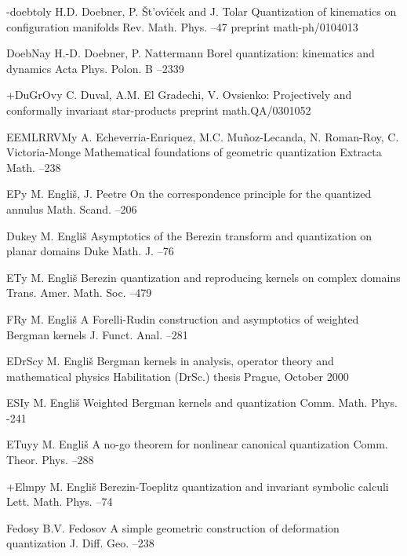 \documentclass[12pt]{amsart}
\numberwithin{equation}{section}
\theoremstyle{remark}
\newcommand{\by}{\mathbf y}
\begin{document}
\begin{thebibliography}{199}
 -doebtol\by{ H.D. Doebner, P. \v{S}t\!'ov{\'\i}\v{c}ek and J. Tolar
\paper Quantization of kinematics on configuration manifolds \jour Rev. Math.
Phys.   --47 \paperinfo preprint math-ph/0104013}

 DoebNa\by{ H.-D. Doebner, P. Nattermann \paper Borel quantization:
kinematics and dynamics \jour Acta Phys. Polon. B   --2339}

 +DuGrOv\by{ C. Duval, A.M. El Gradechi, V. Ovsienko: Projectively and
conformally invariant star-products \paperinfo preprint math.QA/0301052}

 EEMLRRVM\by{ A. Echeverria-Enriquez, M.C. Mu\~noz-Lecanda, N. Roman-Roy,
C. Victoria-Monge \paper Mathematical foundations of geometric quantization
\jour Extracta Math.   --238}

 EP\by{ M. Engli\v s, J. Peetre \paper On the correspondence principle for
the quantized annulus \jour Math. Scand.   --206}

 Duke\by{ M. Engli\v s \paper Asymptotics of the Berezin transform and
quantization on planar domains \jour Duke Math. J.  --76}

 ET\by{ M. Engli\v s \paper Berezin quantization and reproducing kernels
on complex domains \jour Trans. Amer. Math. Soc.  --479}

 FR\by{ M. Engli\v s \paper A Forelli-Rudin construction and asymptotics
of weighted Bergman kernels \jour J. Funct. Anal.   --281}

 EDrSc\by{ M. Engli\v s \paper Bergman kernels in analysis, operator
theory and mathematical physics \paperinfo Habilitation (DrSc.) thesis
\publaddr Prague, October 2000}

 ESI\by{ M. Engli\v s \paper Weighted Bergman kernels and quantization
\jour Comm. Math. Phys.   -241}

 ETuy\by{ M. Engli\v s \paper A no-go theorem for nonlinear canonical
quantization \jour Comm. Theor. Phys.   --288}

 +Elmp\by{ M. Engli\v s \paper Berezin-Toeplitz quantization and invariant
symbolic calculi \jour Lett. Math. Phys.   --74}

 Fedos\by{ B.V. Fedosov \paper A simple geometric construction of
deformation quantization \jour J. Diff. Geo.   --238}


\end{thebibliography}
\end{document}
